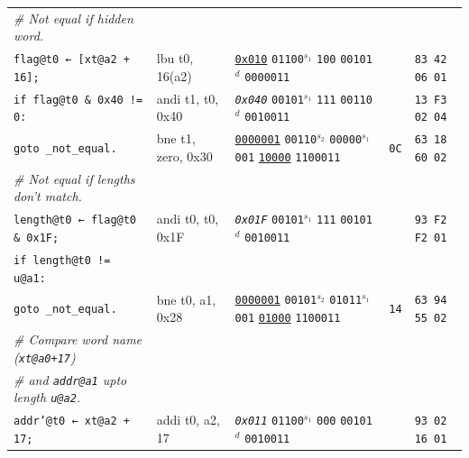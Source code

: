 \documentclass[a4paper,12pt,final]{article}
\begin{document}
\begin{table}[!htbp]
\begin{adjustwidth}{-1cm}{-1cm}
\begin{center}
\begin{tabular}{l|ll|l|l}
\hspace{1.053000em} \emph{\# Not equal if hidden word.} &  &  &  & \\[0pt]
\hspace{1.053000em} \texttt{flag@t0 ← [xt@a2 + 16];} & lbu t0, 16(a2) & \uline{\texttt{0x010}}                    \texttt{01100}​\(^{s_{1}}\) \texttt{100} \texttt{00101}​\(^{d}\)  \texttt{0000011} &  & \texttt{83 42 06 01}\\[0pt]
\hspace{1.053000em} \texttt{if flag@t0 \& 0x40 != 0:} & andi t1, t0, 0x40 & \emph{\texttt{0x040}}                    \texttt{00101}​\(^{s_{1}}\) \texttt{111} \texttt{00110}​\(^{d}\)  \texttt{0010011} &  & \texttt{13 F3 02 04}\\[0pt]
\hspace{2.106000em}   \texttt{goto \_not\_equal.} & bne t1, zero, 0x30 & \uline{\texttt{0000001}} \texttt{00110}​\(^{s_{2}}\) \texttt{00000}​\(^{s_{1}}\) \texttt{001} \uline{\texttt{10000}} \texttt{1100011} & \texttt{0C} & \texttt{63 18 60 02}\\[0pt]
\hspace{1.053000em} \emph{\# Not equal if lengths don't match.} &  &  &  & \\[0pt]
\hspace{1.053000em} \texttt{length@t0 ← flag@t0 \& 0x1F;} & andi t0, t0, 0x1F & \emph{\texttt{0x01F}}                    \texttt{00101}​\(^{s_{1}}\) \texttt{111} \texttt{00101}​\(^{d}\)  \texttt{0010011} &  & \texttt{93 F2 F2 01}\\[0pt]
\hspace{1.053000em} \texttt{if length@t0 != u@a1:} &  &  &  & \\[0pt]
\hspace{2.106000em}   \texttt{goto \_not\_equal.} & bne t0, a1, 0x28 & \uline{\texttt{0000001}} \texttt{00101}​\(^{s_{2}}\) \texttt{01011}​\(^{s_{1}}\) \texttt{001} \uline{\texttt{01000}} \texttt{1100011} & \texttt{14} & \texttt{63 94 55 02}\\[0pt]
\hspace{1.053000em} \emph{\# Compare word name (\texttt{xt@a0+17})} &  &  &  & \\[0pt]
\hspace{1.053000em} \emph{\# and \texttt{addr@a1} upto length \texttt{u@a2}.} &  &  &  & \\[0pt]
\hspace{1.053000em} \texttt{addr'@t0 ← xt@a2 + 17;} & addi t0, a2, 17 & \emph{\texttt{0x011}}                    \texttt{01100}​\(^{s_{1}}\) \texttt{000} \texttt{00101}​\(^{d}\)  \texttt{0010011} &  & \texttt{93 02 16 01}\\[0pt]

\end{tabular}
\end{center}
\end{adjustwidth}
\end{table}
\end{document}
